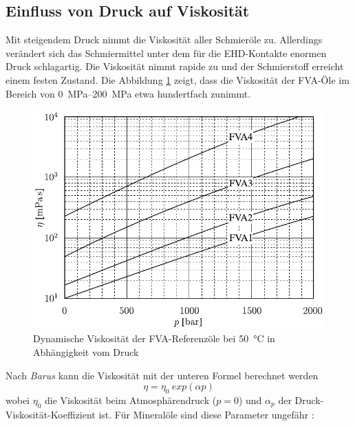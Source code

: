 \subsection*{Einfluss von Druck auf Viskosität}
\label{sub:einfluss_von_druck_auf_viskositaet}
Mit steigendem Druck nimmt die Viskosität aller Schmieröle zu.
Allerdings verändert sich das Schmiermittel unter dem für die EHD-Kontakte enormen Druck schlagartig.
Die Viskosität nimmt rapide zu und der Schmierstoff erreicht einem festen Zustand.
Die Abbildung \ref{fig:dynamische_viskositaet_in_abhaengigkeit_vom_druck} zeigt, dass die Viskosität der FVA-Öle im Bereich von \SIrange{0}{200}{\mega\pascal} etwa hundertfach zunimmt.
\begin{figure}[htb]
    \centering
    \includegraphics[]{./images/viskositaet_druck.pdf}
    \caption{Dynamische Viskosität der FVA-Referenzöle bei \SI{50}{\degreeCelsius} in Abhängigkeit vom Druck \cite{schilling_1985}}
    \label{fig:dynamische_viskositaet_in_abhaengigkeit_vom_druck}
\end{figure}
%

Nach \textit{Barus} \cite{cameron_1966} kann die Viskosität mit der unteren Formel berechnet werden
\begin{equation}
    \eta = \eta_0 \ exp(\alpha p)
    \label{eq:dynamische_viskositaet_druck_barus}
\end{equation}
%
wobei $\eta_0$ die Viskosität beim Atmosphärendruck ($p =  0$) und $\alpha_p$ der Druck-Viskosität-Koeffizient  ist.
Für Mineralöle sind diese Parameter ungefähr \cite{wisniewski_2000}:


